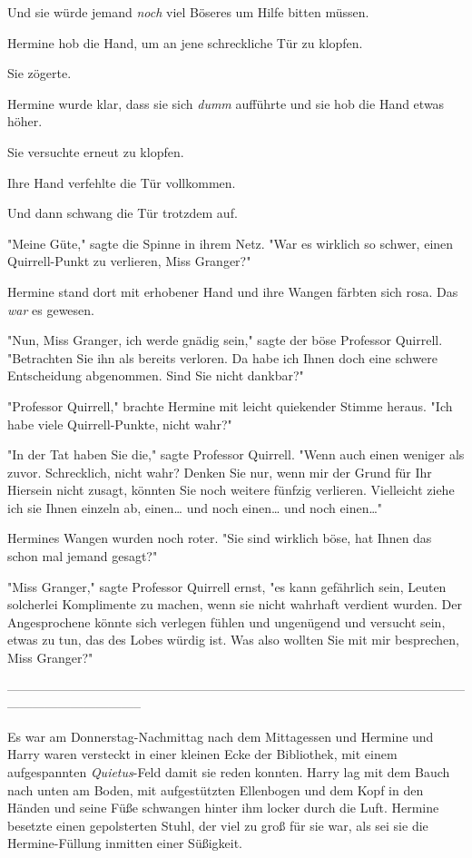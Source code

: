 {Und sie würde jemand \emph{noch} viel Böseres um Hilfe bitten müssen.

Hermine hob die Hand, um an jene schreckliche Tür zu klopfen.

Sie zögerte.

Hermine wurde klar, dass sie sich \emph{dumm} aufführte und sie hob die Hand etwas höher.

Sie versuchte erneut zu klopfen.

Ihre Hand verfehlte die Tür vollkommen.

Und dann schwang die Tür trotzdem auf.

"Meine Güte," sagte die Spinne in ihrem Netz. "War es wirklich so schwer, einen Quirrell-Punkt zu verlieren, Miss Granger?"

Hermine stand dort mit erhobener Hand und ihre Wangen färbten sich rosa. Das \emph{war} es gewesen.

"Nun, Miss Granger, ich werde gnädig sein," sagte der böse Professor Quirrell. "Betrachten Sie ihn als bereits verloren. Da habe ich Ihnen doch eine schwere Entscheidung abgenommen. Sind Sie nicht dankbar?"

"Professor Quirrell," brachte Hermine mit leicht quiekender Stimme heraus. "Ich habe viele Quirrell-Punkte, nicht wahr?"

"In der Tat haben Sie die," sagte Professor Quirrell. "Wenn auch einen weniger als zuvor. Schrecklich, nicht wahr? Denken Sie nur, wenn mir der Grund für Ihr Hiersein nicht zusagt, könnten Sie noch weitere fünfzig verlieren. Vielleicht ziehe ich sie Ihnen einzeln ab, einen… und noch einen… und noch einen…"

Hermines Wangen wurden noch roter. "Sie sind wirklich böse, hat Ihnen das schon mal jemand gesagt?"

"Miss Granger," sagte Professor Quirrell ernst, "es kann gefährlich sein, Leuten solcherlei Komplimente zu machen, wenn sie nicht wahrhaft verdient wurden. Der Angesprochene könnte sich verlegen fühlen und ungenügend und versucht sein, etwas zu tun, das des Lobes würdig ist. Was also wollten Sie mit mir besprechen, Miss Granger?"

--------------------------------------------------------------------------------------------------------------------------------------------

Es war am Donnerstag-Nachmittag nach dem Mittagessen und Hermine und Harry waren versteckt in einer kleinen Ecke der Bibliothek, mit einem aufgespannten \emph{Quietus}-Feld damit sie reden konnten. Harry lag mit dem Bauch nach unten am Boden, mit aufgestützten Ellenbogen und dem Kopf in den Händen und seine Füße schwangen hinter ihm locker durch die Luft. Hermine besetzte einen gepolsterten Stuhl, der viel zu groß für sie war, als sei sie die Hermine-Füllung inmitten einer Süßigkeit.

}

